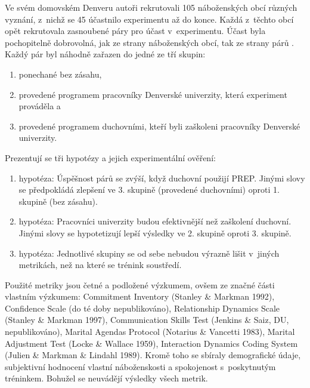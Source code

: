 Ve svém domovském Denveru autoři rekrutovali 105 náboženských obcí různých
vyznání, z~nichž se 45 účastnilo experimentu až do konce. Každá z~těchto obcí
opět rekrutovala zasnoubené páry pro účast v~experimentu. Účast byla
pochopitelně dobrovolná, jak ze strany náboženských obcí, tak ze strany párů%
. Každý
pár byl náhodně zařazen do jedné ze tří skupin:
\begin{enumerate}
  \item{ponechané bez zásahu,}
  \item{
    provedené programem pracovníky Denverské univerzity, která experiment
    prováděla a
  }
  \item{
    provedené programem duchovními, kteří byli zaškoleni pracovníky Denverské
    univerzity.
  }
\end{enumerate}

Prezentují se tři hypotézy a jejich experimentální ověření:
\begin{enumerate}
  \item{
    hypotéza: Úspěšnost párů se zvýší, když duchovní použijí PREP. Jinými slovy
    se předpokládá zlepšení ve 3. skupině (provedené duchovními) oproti 1.
    skupině (bez zásahu).
  }
  \item{
    hypotéza: Pracovníci univerzity budou efektivnější než zaškolení duchovní.
    Jinými slovy se hypotetizují lepší výsledky ve 2. skupině oproti 3. skupině.
  }
  \item{
    hypotéza: Jednotlivé skupiny se od sebe nebudou výrazně lišit v~jiných
    metrikách, než na které se trénink soustředí.
  }
\end{enumerate}

Použité metriky jsou četné a podložené výzkumem, ovšem ze značné části vlastním
výzkumem: Commitment Inventory (Stanley \& Markman
1992\cite{stanley1992assessing}), Confidence Scale (do té doby nepublikováno),
Relationship Dynamics Scale (Stanley \& Markman 1997\cite{stanley1997marriage}),
Communication Skills Test (Jenkins \& Saiz, DU, nepublikováno), Marital Agendas
Protocol (Notarius \& Vancetti 1983\cite{notarius1983marital}), Marital
Adjustment Test (Locke \& Wallace 1959\cite{locke1959short}), Interaction
Dynamics Coding System (Julien \& Markman \& Lindahl
1989\cite{julien1989comparison}). Kromě toho se sbíraly demografické údaje,
subjektivní hodnocení vlastní náboženskosti a spokojenost s~poskytnutým
tréninkem. Bohužel se neuvádějí výsledky všech metrik.

